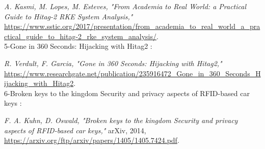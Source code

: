 \documentclass{template}
\begin{document}
\textit{A. Kasmi, M. Lopes, M. Esteves, "From Academia to Real World: a Practical Guide to Hitag-2 RKE System Analysis,"} \url{https://www.sstic.org/2017/presentation/from_academia_to_real_world_a_practical_guide_to_hitag-2_rke_system_analysis/}.\\

5-Gone in 360 Seconds: Hijacking with Hitag2 :

\textit{R. Verdult, F. Garcia, "Gone in 360 Seconds: Hijacking with Hitag2,"} \url{https://www.researchgate.net/publication/235916472_Gone_in_360_Seconds_Hijacking_with_Hitag2}.\\

6-Broken keys to the kingdom Security and privacy aspects of RFID-based car keys :

\textit{F. A. Kuhn, D. Oswald, "Broken keys to the kingdom Security and privacy aspects of RFID-based car keys,"} arXiv, 2014, \url{https://arxiv.org/ftp/arxiv/papers/1405/1405.7424.pdf}.
\end{document}
